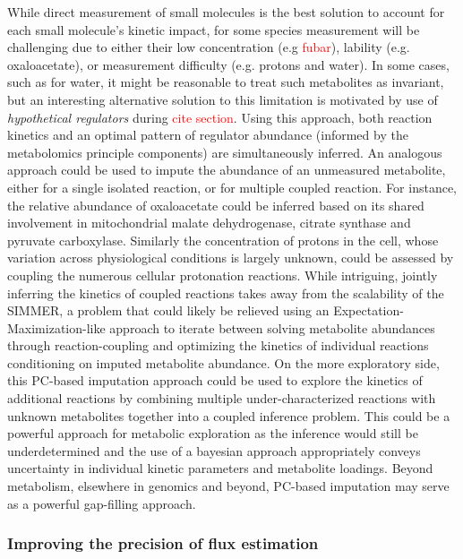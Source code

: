 While direct measurement of small molecules is the best solution to account for each small molecule's kinetic impact, for some species measurement will be challenging due to either their low concentration (e.g \textcolor{red}{fubar}), lability (e.g. oxaloacetate), or measurement difficulty (e.g. protons and water). In some cases, such as for water, it might be reasonable to treat such metabolites as invariant, but an interesting alternative solution to this limitation is motivated by use of \textit{hypothetical regulators} during \textcolor{red}{cite section}.  Using this approach, both reaction kinetics and an optimal pattern of regulator abundance (informed by the metabolomics principle components) are simultaneously inferred. An analogous approach could be used to impute the abundance of an unmeasured metabolite, either for a single isolated reaction, or for multiple coupled reaction.  For instance, the relative abundance of oxaloacetate could be inferred based on its shared involvement in mitochondrial malate dehydrogenase, citrate synthase and pyruvate carboxylase. Similarly the concentration of protons in the cell, whose variation across physiological conditions is largely unknown, could be assessed by coupling the numerous cellular protonation reactions. While intriguing, jointly inferring the kinetics of coupled reactions takes away from the scalability of the SIMMER, a problem that could likely be relieved using an Expectation-Maximization-like approach to iterate between solving metabolite abundances through reaction-coupling and optimizing the kinetics of individual reactions conditioning on imputed metabolite abundance. On the more exploratory side, this PC-based imputation approach could be used to explore the kinetics of additional reactions by combining multiple under-characterized reactions with unknown metabolites together into a coupled inference problem. This could be a powerful approach for metabolic exploration as the inference would still be underdetermined and the use of a bayesian approach appropriately conveys uncertainty in individual kinetic parameters and metabolite loadings. Beyond metabolism, elsewhere in genomics and beyond, PC-based imputation may serve as a powerful gap-filling approach.

\subsubsection{Improving the precision of flux estimation}

